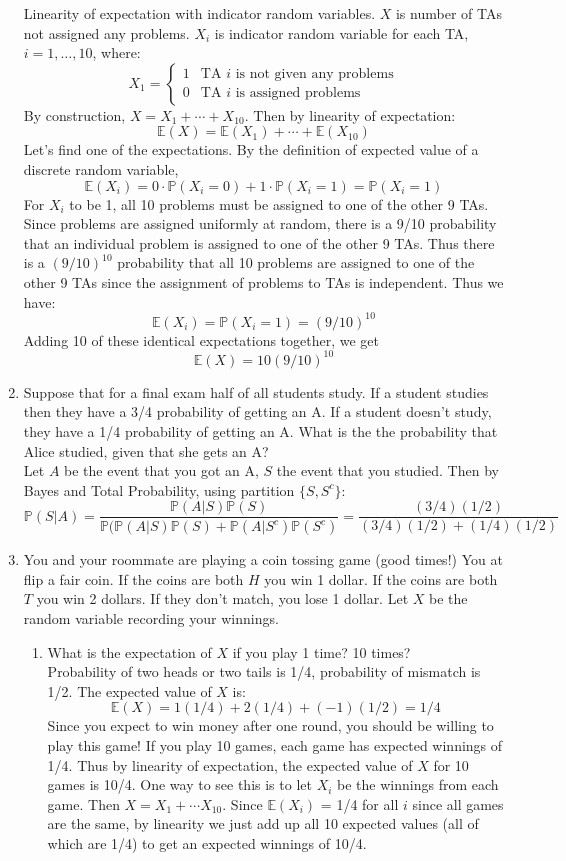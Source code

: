 \documentclass[12pt]{article}
\def\P{{\mathbb P}}
\def\E{{\mathbb E}}
\begin{document}
\begin{enumerate}
Linearity of expectation with indicator random variables. $X$ is number of TAs not assigned any problems. $X_i$ is indicator random variable for each TA, $i = 1, \dots, 10$, where:
\[
X_1 = \begin{cases}
1 & \text{TA $i$ is not given any problems}\\
0 & \text{TA $i$ is assigned problems}
\end{cases}
\]
By construction, $X = X_1 + \cdots + X_{10}$. Then by linearity of expectation:
\[
\E(X) = \E(X_1) + \cdots + \E(X_{10}) 
\]
Let's find one of the expectations. By the definition of expected value of a discrete random variable,
\[
\E(X_i) = 0 \cdot \P(X_i = 0) + 1 \cdot \P(X_i = 1) = \P(X_i = 1)
\]
For $X_i$ to be 1, all 10 problems must be assigned to one of the other 9 TAs. Since problems are assigned uniformly at random, there is a 9/10 probability that an individual problem is assigned to one of the other 9 TAs. Thus there is a $(9/10)^10$ probability that all 10 problems are assigned to one of the other 9 TAs since the assignment of problems to TAs is independent. Thus we have:
\[
\E(X_i) = \P(X_i = 1) = (9/10)^10
\]
Adding 10 of these identical expectations together, we get
\[
\E(X) = 10 (9/10)^{10}
\]

\item Suppose that for a final exam half of all students study. If a student studies then they have a 3/4 probability of getting an A. If a student doesn’t study, they have a 1/4 probability of getting an A. What is the the probability that Alice studied, given that she gets an A?\\

Let $A$ be the event that you got an A, $S$ the event that you studied. Then by Bayes and Total Probability, using partition $\{S, S^c\}$:
\[
\P(S|A) = \frac{ \P(A|S)\P(S)}{\P(\P(A|S)\P(S) + \P(A|S^c)\P(S^c)} = \frac{(3/4)(1/2)}{(3/4)(1/2) + (1/4)(1/2)}
\]

\item You and your roommate are playing a coin tossing game (good times!) You at flip a fair coin. If the coins are both $H$ you win 1 dollar. If the coins are both $T$ you win 2 dollars. If they don't match, you lose 1 dollar. Let $X$ be the random variable recording your winnings.
\begin{enumerate}
\item What is the expectation of $X$ if you play 1 time? 10 times? \\

Probability of two heads or two tails is 1/4, probability of mismatch is 1/2. The expected value of $X$ is:
\[
\E(X) = 1(1/4) + 2(1/4) + (-1)(1/2) = 1/4
\]
Since you expect to win money after one round, you should be willing to play this game! If you play 10 games, each game has expected winnings of 1/4. Thus by linearity of expectation, the expected value of $X$ for 10 games is 10/4. One way to see this is to let $X_i$ be the winnings from each game. Then $X = X_1 + \cdots X_{10}$. Since $\E(X_i)$ = 1/4 for all $i$ since all games are the same, by linearity we just add up all 10 expected values (all of which are 1/4) to get an expected winnings of 10/4.


\end{enumerate}
\end{enumerate}
\end{document}
